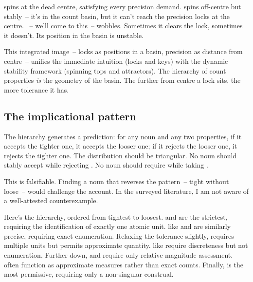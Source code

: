  spins at the dead centre, satisfying every precision demand.  spins off-centre but stably~-- it's in the count basin, but it can't reach the precision locks at the centre. ~-- we'll come to this~-- wobbles. Sometimes it clears the  lock, sometimes it doesn't. Its position in the basin is unstable.

This integrated image~-- locks as positions in a basin, precision as distance from centre~-- unifies the immediate intuition (locks and keys) with the dynamic stability framework (spinning tops and attractors). The hierarchy of count properties \emph{is} the geometry of the basin. The further from centre a lock sits, the more tolerance it has.

\subsection{The implicational pattern}
\label{sec:9:implicational}

The hierarchy generates a prediction: for any noun and any two properties, if it accepts the tighter one, it accepts the looser one; if it rejects the looser one, it rejects the tighter one. The distribution should be triangular. No noun should stably accept  while rejecting . No noun should require  while taking .

This is falsifiable. Finding a noun that reverses the pattern~-- tight without loose~-- would challenge the account. In the surveyed literature, I am not aware of a well-attested counterexample.

Here's the hierarchy, ordered from tightest to loosest.  and  are the strictest, requiring the identification of exactly one atomic unit.  like  and  are similarly precise, requiring exact enumeration. Relaxing the tolerance slightly,  requires multiple units but permits approximate quantity.  like  require discreteness but not enumeration. Further down,  and  require only relative magnitude assessment.  often function as approximate measures rather than exact counts. Finally,  is the most permissive, requiring only a non-singular construal.

